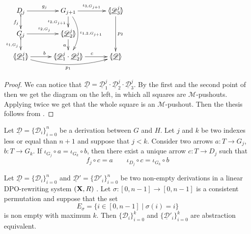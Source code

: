 \documentclass[a4paper,UKenglish,cleveref,pdftex, thm-restate,numberwithinsect,anonymous]{lipics}
\def\R{\mathsf{R}}
\def\X{\textbf {\textup{X}}}
\newcommand{\dder}[1]{\mathscr{#1}}
\newcommand{\der}[1]{\underline{\dder{#1}}}
\newcommand{\lpro}{\langle \hspace{-1.85pt}[}
\newcommand{\rpro}{]\hspace{-1.85pt}\rangle}
\newcommand{\tpro}[1]{\lpro \der{#1}\rpro}
\begin{document}
\noindent 
\parbox{5cm}{\vspace{1em}$
\xymatrix@C=30pt@R=15pt{D_{j} \ar[r]^{g_j}\ar@{>->}[d]_{f_j}& G_{j+1}
	\ar[r]^-{\iota_{3,G_{j+1}}} \ar[d]_{\iota_{2, G_{j+1}}}
	\ar@/^.5cm/[dd]^{\iota_{1,2, G_{j+1}}}& \lpro \der{D}^j_3\rpro
	\ar[dd]^{p_2} \\ G_j \ar[r]^{\iota_{2,
			G_j}}\ar@{>->}[d]_{\iota_{1,G_j}} & \lpro \der{D}^j_2\rpro
	\ar[d]_a\\ \lpro \der{D}^j_1 \rpro \ar@/_.4cm/[rr]_{p_1}
	\ar[r]^b &\lpro \der{D}^j_1\cdot \der{D}^j_2 \rpro
	\ar[r]^c&\tpro{D} }$}\qquad  \qquad
\parbox{7.5cm}{\begin{proof}
	We can notice that
	$\der{D}=\der{D}^j_1\cdot \der{D}^j_2 \cdot \der{D}^j_3$. By the
	first and the second point of  then we get the
	 diagram on the left, in which all squares are $\mathcal{M}$-pushouts. Applying  twice we get that the whole square is an
	$\mathcal{M}$-pushout. Then the thesis follows from
	\Cref{prop:pbpoad}.
\end{proof}}

\begin{corollary}
	\label{cor:ele}
	Let $\der{D}=\{\dder{D}_{i}\}_{i=0}^n$ be a derivation between $G$
	and $H$. Let $j$ and $k$ be two indexes less or equal than $n+1$ and
	suppose that $j< k$.  Consider two arrows $a\colon T\to G_j$,
	$b\colon T\to G_k$. If $\iota_{G_j}\circ a = \iota_{G_k}\circ b$,
	then there exist a unique arrow $c\colon T\to D_j $ such
	that \[f_j\circ c = a\qquad \iota_{D_j}\circ c =\iota_{G_k}\circ b\]
\end{corollary}
\begin{lemma}\label{lem:idevero}
	Let $\der{D}=\{\dder{D}_{i}\}_{i=0}^n$ and $\der{D}'=\{\dder{D}'_i\}_{i=0}^n$ be two non-empty derivations in a linear DPO-rewriting system $(\X, \R)$ . Let  $\sigma:[0,n-1]\to [0,n-1]$  is a consistent permutation and suppose that the set 
	\[E_{\sigma}=\{i\in [0,n-1]\mid \sigma(i)=i\}\]
	is non empty with maximum $k$. Then $\{\dder{D}_i\}_{i=0}^k$ and $\{\der{D}'_i\}_{i=0}^k$ are abstraction equivalent.  
\end{lemma}
\end{document}
